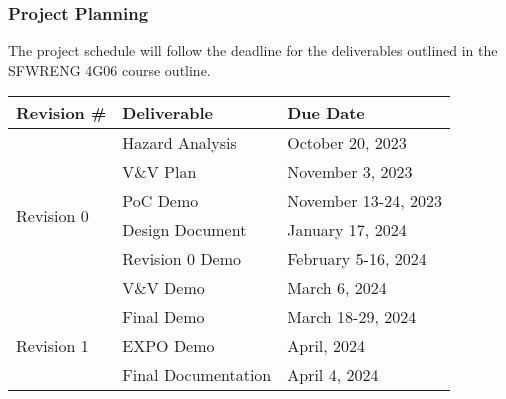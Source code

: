 \documentclass[12pt]{article}
\begin{document}
\subsubsection{Project Planning}
The project schedule will follow the deadline for the deliverables outlined in the SFWRENG 4G06
course outline.

\begin{table}[H]
\begin{tabular}{|l|l|l|}
\hline
Revision \#                 & Deliverable         & Due Date             \\ \hline
\multirow{6}{*}{Revision 0} & Hazard Analysis     & October 20, 2023     \\ \cline{2-3} 
                            & V\&V Plan           & November 3, 2023     \\ \cline{2-3} 
                            & PoC Demo            & November 13-24, 2023 \\ \cline{2-3} 
                            & Design Document     & January 17, 2024     \\ \cline{2-3} 
                            & Revision 0 Demo     & February 5-16, 2024  \\ \cline{2-3} 
                            & V\&V Demo           & March 6, 2024        \\ \hline
\multirow{3}{*}{Revision 1} & Final Demo          & March 18-29, 2024    \\ \cline{2-3} 
                            & EXPO Demo           & April, 2024          \\ \cline{2-3} 
                            & Final Documentation & April 4, 2024        \\ \hline
\end{tabular}
\end{table}
\end{document}
